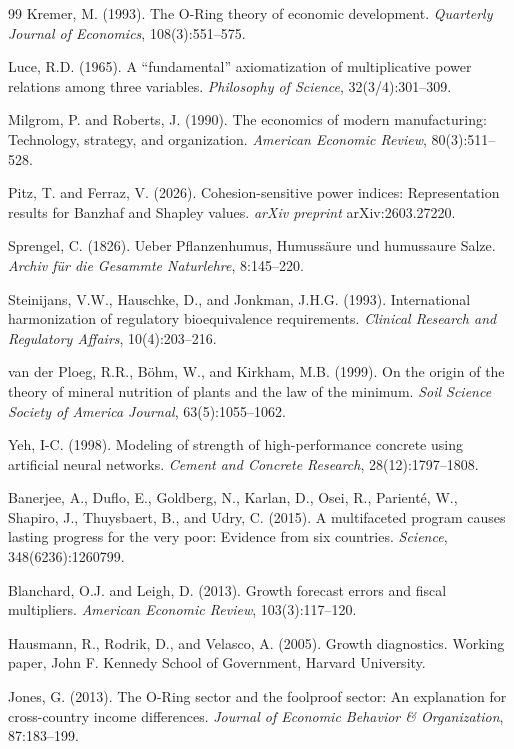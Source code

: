 \documentclass[12pt, a4paper]{article}
\theoremstyle{definition}
\theoremstyle{remark}
\begin{document}
\begin{thebibliography}{99}
Kremer, M. (1993). The O-Ring theory of economic development. \textit{Quarterly Journal of Economics}, 108(3):551--575.

Luce, R.D. (1965). A ``fundamental'' axiomatization of multiplicative power relations among three variables. \textit{Philosophy of Science}, 32(3/4):301--309.

Milgrom, P. and Roberts, J. (1990). The economics of modern manufacturing: Technology, strategy, and organization. \textit{American Economic Review}, 80(3):511--528.

Pitz, T. and Ferraz, V. (2026). Cohesion-sensitive power indices: Representation results for Banzhaf and Shapley values. \textit{arXiv preprint} arXiv:2603.27220.

Sprengel, C. (1826). Ueber Pflanzenhumus, Humuss\"aure und humussaure Salze. \textit{Archiv f\"ur die Gesammte Naturlehre}, 8:145--220.

Steinijans, V.W., Hauschke, D., and Jonkman, J.H.G. (1993). International harmonization of regulatory bioequivalence requirements. \textit{Clinical Research and Regulatory Affairs}, 10(4):203--216.

van der Ploeg, R.R., B\"ohm, W., and Kirkham, M.B. (1999). On the origin of the theory of mineral nutrition of plants and the law of the minimum. \textit{Soil Science Society of America Journal}, 63(5):1055--1062.

Yeh, I-C. (1998). Modeling of strength of high-performance concrete using artificial neural networks. \textit{Cement and Concrete Research}, 28(12):1797--1808.

Banerjee, A., Duflo, E., Goldberg, N., Karlan, D., Osei, R., Parient\'e, W., Shapiro, J., Thuysbaert, B., and Udry, C. (2015). A multifaceted program causes lasting progress for the very poor: Evidence from six countries. \textit{Science}, 348(6236):1260799.

Blanchard, O.J. and Leigh, D. (2013). Growth forecast errors and fiscal multipliers. \textit{American Economic Review}, 103(3):117--120.

Hausmann, R., Rodrik, D., and Velasco, A. (2005). Growth diagnostics. Working paper, John F. Kennedy School of Government, Harvard University.

Jones, G. (2013). The O-Ring sector and the foolproof sector: An explanation for cross-country income differences. \textit{Journal of Economic Behavior \& Organization}, 87:183--199.

\end{thebibliography}
\end{document}
